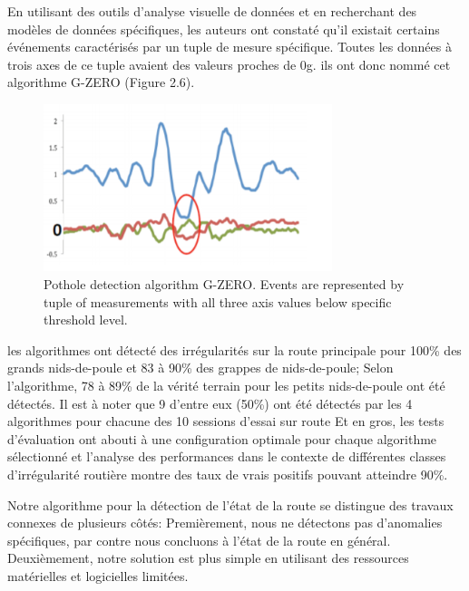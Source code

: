       En utilisant des outils d'analyse visuelle de données et en recherchant des modèles de données spécifiques, les auteurs ont constaté qu'il existait certains événements caractérisés par un tuple de mesure spécifique. Toutes les données à trois axes de ce tuple avaient des valeurs proches de 0g. ils ont donc nommé cet algorithme G-ZERO (Figure 2.6).\newline


   \begin{figure}[h!]
      \center
      \includegraphics[width=0.75\textwidth]{Images/chapter2/relatedWork6.PNG}
     \caption{Pothole detection algorithm G-ZERO. Events are represented by tuple
     of measurements with all three axis values below specific threshold level.}
     \label{fig:graph}
      \end{figure}

      
les algorithmes ont détecté des irrégularités sur la route principale pour 100\% des grands nids-de-poule et 83 à 90\% des grappes de nids-de-poule; Selon l'algorithme, 78 à 89\% de la vérité terrain pour les petits nids-de-poule ont été détectés. Il est à noter que 9 d'entre eux (50\%) ont été détectés par les 4 algorithmes pour chacune des 10 sessions d'essai sur route
Et en gros, les tests d'évaluation ont abouti à une configuration optimale pour chaque algorithme sélectionné et l'analyse des performances dans le contexte de différentes classes d'irrégularité routière montre des taux de vrais positifs pouvant atteindre 90\%. \newline 



   Notre algorithme pour la détection de l'état de la route se distingue des travaux connexes de plusieurs côtés: \newline
Premièrement, nous ne détectons pas d'anomalies spécifiques, par contre nous concluons à l'état de la route en général. \newline
Deuxièmement, notre solution est plus simple en utilisant des ressources matérielles et logicielles limitées. \newline

